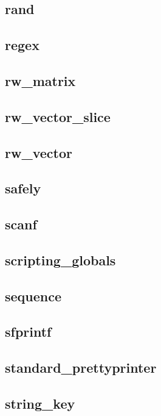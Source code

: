 \subsection{rand}						
\subsection{regex}						
\subsection{rw\_matrix}						
\subsection{rw\_vector\_slice}					
\subsection{rw\_vector}						
\subsection{safely}						
\subsection{scanf}						
\subsection{scripting\_globals}					
\subsection{sequence}						
\subsection{sfprintf}						
\subsection{standard\_prettyprinter}				
\subsection{string\_key}					
